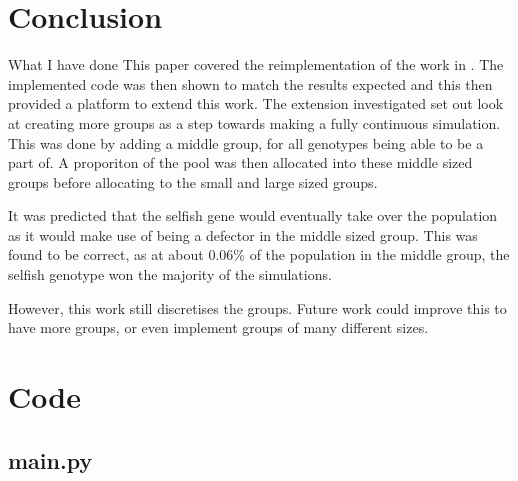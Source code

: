 \documentclass[11pt]{ecsarticle}
\begin{document}
\section{Conclusion}\label{sc:conclusion}

What I have done
This paper covered the reimplementation of the work in \cite{powers2007individual}. 
The implemented code was then shown to match the results expected and this then provided a platform to extend this work. 
The extension investigated set out look at creating more groups as a step towards making a fully continuous simulation.
This was done by adding a middle group, for all genotypes being able to be a part of. 
A proporiton of the pool was then allocated into these middle sized groups before allocating to the small and large sized groups.

It was predicted that the selfish gene would eventually take over the population as it would make use of being a defector in the middle sized group. 
This was found to be correct, as at about 0.06\% of the population in the middle group, the selfish genotype won the majority of the simulations.

However, this work still discretises the groups. 
Future work could improve this to have more groups, or even implement groups of many different sizes.




 

 \clearpage
 \section{Code}
 \lstset{language=Python} 
 \subsection{main.py}
 
\end{document}
